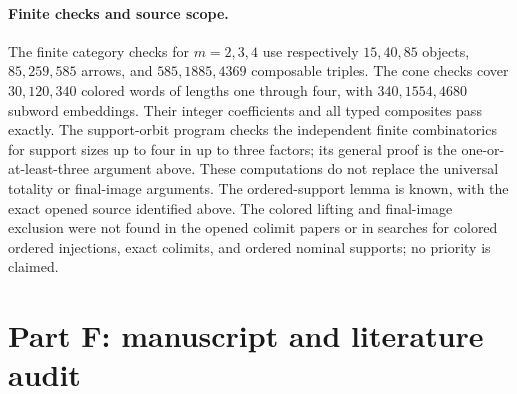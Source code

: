 \documentclass[11pt,a4paper]{article}
\theoremstyle{definition}
\begin{document}
\paragraph{Finite checks and source scope.}
The finite category checks for $m=2,3,4$ use respectively
$15,40,85$ objects, $85,259,585$ arrows, and
$585,1885,4369$ composable triples. The cone checks cover
$30,120,340$ colored words of lengths one through four, with
$340,1554,4680$ subword embeddings. Their integer coefficients
and all typed composites pass exactly. The support-orbit program
checks the independent finite combinatorics for support sizes up
to four in up to three factors; its general proof is the
one-or-at-least-three argument above. These computations do not
replace the universal totality or final-image arguments.
The ordered-support lemma is known, with the exact opened source
identified above. The colored lifting and final-image exclusion
were not found in the opened colimit papers or in searches for
colored ordered injections, exact colimits, and ordered nominal
supports; no priority is claimed.
\section{Part F: manuscript and literature audit}\label{sec:F}
\end{document}
